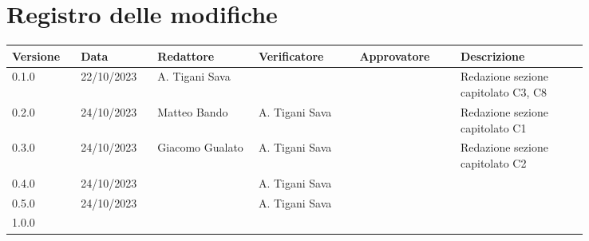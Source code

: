 \section{Registro delle modifiche}
{
\renewcommand{\arraystretch}{1.5}
\scriptsize
\begin{tabular}{p{0.10\linewidth}p{0.10\linewidth}p{0.15\linewidth}p{0.15\linewidth}p{0.15\linewidth}p{0.19\linewidth}}
    \textbf{Versione}   & \textbf{Data} & \textbf{Redattore}    & \textbf{Verificatore} & \textbf{Approvatore}  & \textbf{Descrizione}  \\
    \hline
    0.1.0               & 22/10/2023    & A. Tigani Sava        &                       &                       & Redazione sezione capitolato C3, C8  	\\
    0.2.0               & 24/10/2023    & Matteo Bando          & A. Tigani Sava		&                       & Redazione sezione capitolato C1		\\
    0.3.0               & 24/10/2023    & Giacomo Gualato       & A. Tigani Sava		&                       & Redazione sezione capitolato C2		\\
    0.4.0               & 24/10/2023    &                       & A. Tigani Sava		&                       &	\\
    0.5.0               & 24/10/2023    &                       & A. Tigani Sava		&                       &	\\
    1.0.0 \\
    \hline
\end{tabular}
}